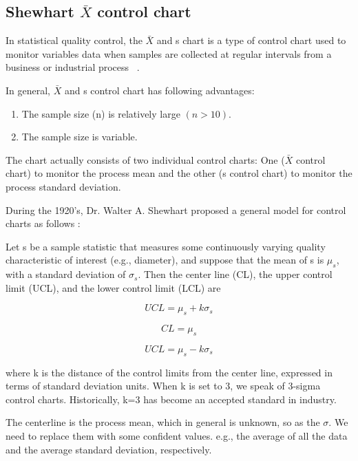 \subsection{Shewhart $\bar{X}$ control chart}
In statistical quality control, the $\bar{X}$ and s chart is a type of control chart used to monitor variables data when samples are collected at regular intervals from a business or industrial process ~\cite{heckert2002handbook}. 

In general, $\bar{X}$ and s control chart has following advantages:
\begin{enumerate}
    \item The sample size (n) is relatively large $(n>10)$.
    \item The sample size is variable.
\end{enumerate}

The chart actually consists of two individual control charts: One ($\bar{X}$ control chart) to monitor the process mean and the other (s control chart) to monitor the process standard deviation.

During the 1920's, Dr. Walter A. Shewhart proposed a general model for control charts as follows :

Let s be a sample statistic that measures some continuously varying quality characteristic of interest (e.g., diameter), and suppose that the mean of s is $\mu_{s}$, with a standard deviation of $\sigma_{s}$. Then the center line (CL), the upper control limit (UCL), and the lower control limit (LCL) are


\begin{equation}
    U C L=\mu_{s}+k \sigma_{s}
    \label{equ:UCL}
\end{equation}

\begin{equation}
    C L=\mu_{s}
    \label{equ:CL}
\end{equation}

\begin{equation}
    U C L=\mu_{s}-k \sigma_{s}
    \label{equ:LCL}
\end{equation}

where k is the distance of the control limits from the center line, expressed in terms of standard deviation units. When k is set to 3, we speak of 3-sigma control charts. Historically, k=3 has become an accepted standard in industry.

The centerline is the process mean, which in general is unknown, so as the $\sigma$. We need to replace them with some confident values. e.g., the average of all the data and the average standard deviation, respectively. 

